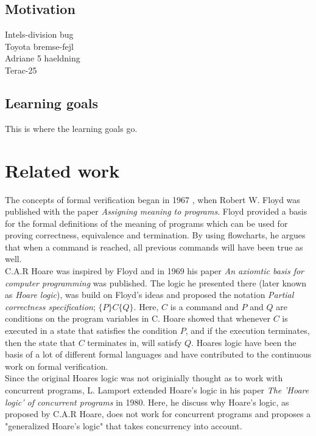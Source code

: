 \documentclass[a4paper]{report}
\begin{document}
\section{Motivation}
Intels-division bug \\
Toyota bremse-fejl\\
Adriane 5 haeldning\\
Terac-25\\
\section{Learning goals}
This is where the learning goals go.
\chapter{Related work}
The concepts of formal verification began in 1967 , when Robert W. Floyd was published with the paper \textit{Assigning meaning to programs}\cite{Floyd1967}. Floyd provided a basis for the formal definitions of the meaning of programs which can be used for proving correctness, equivalence and termination. By using flowcharts, he argues that when a command is reached, all previous commands will have been true as well.\\ C.A.R Hoare was inspired by Floyd and in 1969 his paper \textit{An axiomtic basis for computer programming}\cite{Hoare1969} was published. The logic he presented there (later known as \textit{Hoare logic}), was build on Floyd's ideas and proposed the notation \textit{Partial correctness specification}; $\{P\} C \{Q\}$. Here, $C$ is a command and $P$ and $Q$ are conditions on the program variables in C. Hoare showed that whenever $C$ is executed in a state that satisfies the condition $P$, and if the execution terminates, then the state that $C$ terminates in, will satisfy $Q$. Hoares logic have been the basis of a lot of different formal languages and have contributed to the continuous work on formal verification.  \\ 
Since the original Hoares logic was not originially thought as to work with concurrent programs, L. Lamport extended Hoare's logic in his paper \textit{The 'Hoare logic' of concurrent programs}\cite{Lamport1980} in 1980. Here, he discuss why Hoare's logic, as proposed by C.A.R Hoare, does not work for concurrent programs and proposes a "generalized Hoare's logic" that takes concurrency into account. \\\\
\end{document}
